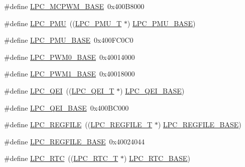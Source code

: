 \begin{DoxyCompactItemize}
\item 
\#define \hyperlink{group__PERIPH__407X__8X__BASE_gad8a41dc802e3ea0ba9457d42a6927c03}{L\+P\+C\+\_\+\+M\+C\+P\+W\+M\+\_\+\+B\+A\+SE}~0x400\+B8000
\item 
\#define \hyperlink{group__PERIPH__407X__8X__BASE_ga9d540cc313db00679c10f9ac1961b06a}{L\+P\+C\+\_\+\+P\+MU}~((\hyperlink{structLPC__PMU__T}{L\+P\+C\+\_\+\+P\+M\+U\+\_\+T}              $\ast$) \hyperlink{group__PERIPH__407X__8X__BASE_ga865bed8ad61e9e273439ad1349a46d68}{L\+P\+C\+\_\+\+P\+M\+U\+\_\+\+B\+A\+SE})
\item 
\#define \hyperlink{group__PERIPH__407X__8X__BASE_ga865bed8ad61e9e273439ad1349a46d68}{L\+P\+C\+\_\+\+P\+M\+U\+\_\+\+B\+A\+SE}~0x400\+F\+C0\+C0
\item 
\#define \hyperlink{group__PERIPH__407X__8X__BASE_gad2e9bbd8d91b559eed11b8e83bd73bbf}{L\+P\+C\+\_\+\+P\+W\+M0\+\_\+\+B\+A\+SE}~0x40014000
\item 
\#define \hyperlink{group__PERIPH__407X__8X__BASE_gabb885bd92b4a003b94dc27c4700818bb}{L\+P\+C\+\_\+\+P\+W\+M1\+\_\+\+B\+A\+SE}~0x40018000
\item 
\#define \hyperlink{group__PERIPH__407X__8X__BASE_ga71347b58898f54f8e9f00a6c652c7d49}{L\+P\+C\+\_\+\+Q\+EI}~((\hyperlink{structLPC__QEI__T}{L\+P\+C\+\_\+\+Q\+E\+I\+\_\+T}              $\ast$) \hyperlink{group__PERIPH__407X__8X__BASE_ga80fa25b18324c10c8e5c26893e6f0a67}{L\+P\+C\+\_\+\+Q\+E\+I\+\_\+\+B\+A\+SE})
\item 
\#define \hyperlink{group__PERIPH__407X__8X__BASE_ga80fa25b18324c10c8e5c26893e6f0a67}{L\+P\+C\+\_\+\+Q\+E\+I\+\_\+\+B\+A\+SE}~0x400\+B\+C000
\item 
\#define \hyperlink{group__PERIPH__407X__8X__BASE_ga2c74da31b7fd461d9b01e3241963f895}{L\+P\+C\+\_\+\+R\+E\+G\+F\+I\+LE}~((\hyperlink{structLPC__REGFILE__T}{L\+P\+C\+\_\+\+R\+E\+G\+F\+I\+L\+E\+\_\+T}          $\ast$) \hyperlink{group__PERIPH__407X__8X__BASE_gad2674eff10cea9243ab060ad1fbac9d2}{L\+P\+C\+\_\+\+R\+E\+G\+F\+I\+L\+E\+\_\+\+B\+A\+SE})
\item 
\#define \hyperlink{group__PERIPH__407X__8X__BASE_gad2674eff10cea9243ab060ad1fbac9d2}{L\+P\+C\+\_\+\+R\+E\+G\+F\+I\+L\+E\+\_\+\+B\+A\+SE}~0x40024044
\item 
\#define \hyperlink{group__PERIPH__407X__8X__BASE_ga8303d3e5135b2a039f0dc5f93c194f78}{L\+P\+C\+\_\+\+R\+TC}~((\hyperlink{structLPC__RTC__T}{L\+P\+C\+\_\+\+R\+T\+C\+\_\+T}              $\ast$) \hyperlink{group__PERIPH__407X__8X__BASE_ga4618213cf968f8245814d7d3e7aa2e2e}{L\+P\+C\+\_\+\+R\+T\+C\+\_\+\+B\+A\+SE})

\end{DoxyCompactItemize}
